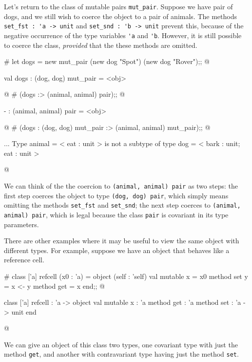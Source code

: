 Let's return to the class of mutable pairs \hbox{\lstinline$mut_pair$}.
Suppose we have pair of dogs, and we still wish to coerce the
object to a pair of animals.  The methods
\hbox{\lstinline$set_fst : 'a -> unit$} and \hbox{\lstinline$set_snd : 'b -> unit$}
prevent this, because of the negative occurrence of the type
variables \hbox{\lstinline$'a$} and \hbox{\lstinline$'b$}.  However, it is still
possible to coerce the class, \emph{provided} that
the these methods are omitted.

\begin{ocaml}
# let dogs = new mut_pair (new dog "Spot") (new dog "Rover");;
@
\begin{topoutput}
val dogs : (dog, dog) mut_pair = <obj>
\end{topoutput}
@
# (dogs :> (animal, animal) pair);;
@
\begin{topoutput}
- : (animal, animal) pair = <obj>
\end{topoutput}
@
# (dogs : (dog, dog) mut_pair :> (animal, animal) mut_pair);;
@
\begin{toperror}
...
Type animal = < eat : unit > is not a subtype of type
  dog = < bark : unit; eat : unit >
\end{toperror}
@
\end{ocaml}
%
We can think of the the coercion to \hbox{\lstinline$(animal, animal) pair$}
as two steps: the first step coerces the object to type \hbox{\lstinline$(dog, dog) pair$},
which simply means omitting the methods \hbox{\lstinline$set_fst$}
and \hbox{\lstinline$set_snd$}; the next step coerces to 
\hbox{\lstinline$(animal, animal) pair$},
which is legal because the class \hbox{\lstinline$pair$} is covariant in its
type parameters.

There are other examples where it may be useful to view the same
object with different types.  For example, suppose we have an
object that behaves like a reference cell.

\begin{ocaml}
# class ['a] refcell (x0 : 'a) =
    object (self : 'self)
       val mutable x = x0
       method set y = x <- y
       method get = x
    end;;
@
\begin{topoutput}
class ['a] refcell : 'a ->
  object val mutable x : 'a method get : 'a method set : 'a -> unit end
\end{topoutput}
@
\end{ocaml}
%
We can give an object of this class two types, one covariant type with
just the method \hbox{\lstinline$get$}, and another with contravariant type
having just the method \hbox{\lstinline$set$}.

